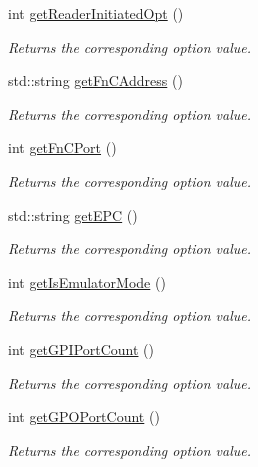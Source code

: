 {\bf }\par
\begin{DoxyCompactItemize}
\item 
int \hyperlink{class_e_l_f_i_n_1_1_program_options_aa230c3fa171bb043cbc5eb8d8735bae9}{get\-Reader\-Initiated\-Opt} ()
\begin{DoxyCompactList}\small\item\em Returns the corresponding option value. \end{DoxyCompactList}\item 
std\-::string \hyperlink{class_e_l_f_i_n_1_1_program_options_a70ff019169c55e71c5d6b4083ffc8acf}{get\-Fn\-C\-Address} ()
\begin{DoxyCompactList}\small\item\em Returns the corresponding option value. \end{DoxyCompactList}\item 
int \hyperlink{class_e_l_f_i_n_1_1_program_options_a862c78cff3445b6c69c982d64c553ed1}{get\-Fn\-C\-Port} ()
\begin{DoxyCompactList}\small\item\em Returns the corresponding option value. \end{DoxyCompactList}\item 
std\-::string \hyperlink{class_e_l_f_i_n_1_1_program_options_ac25f97f994242da0fd2f95e36eee4dda}{get\-E\-P\-C} ()
\begin{DoxyCompactList}\small\item\em Returns the corresponding option value. \end{DoxyCompactList}\item 
int \hyperlink{class_e_l_f_i_n_1_1_program_options_a8db8c8e9f0382d71fc926c42e68c9af6}{get\-Is\-Emulator\-Mode} ()
\begin{DoxyCompactList}\small\item\em Returns the corresponding option value. \end{DoxyCompactList}\item 
int \hyperlink{class_e_l_f_i_n_1_1_program_options_a1cb191c3e34401d0550339ab3b62ac48}{get\-G\-P\-I\-Port\-Count} ()
\begin{DoxyCompactList}\small\item\em Returns the corresponding option value. \end{DoxyCompactList}\item 
int \hyperlink{class_e_l_f_i_n_1_1_program_options_ad60494ff56373efc80912162561a8fa3}{get\-G\-P\-O\-Port\-Count} ()
\begin{DoxyCompactList}\small\item\em Returns the corresponding option value. \end{DoxyCompactList}\item 

\end{DoxyCompactItemize}
